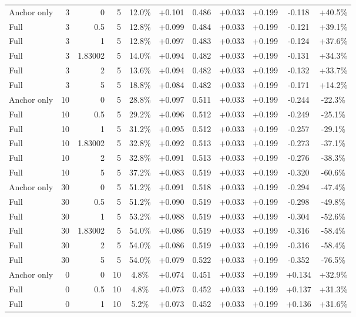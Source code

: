 \begin{table}[htbp]
\begin{tabular}{lrrrccccccc}
Anchor only & 3 & 0 & 5 & 12.0\% & +0.101 & 0.486 & +0.033 & +0.199 & -0.118 & +40.5\% \\
Full & 3 & 0.5 & 5 & 12.8\% & +0.099 & 0.484 & +0.033 & +0.199 & -0.121 & +39.1\% \\
Full & 3 & 1 & 5 & 12.8\% & +0.097 & 0.483 & +0.033 & +0.199 & -0.124 & +37.6\% \\
Full & 3 & 1.83002 & 5 & 14.0\% & +0.094 & 0.482 & +0.033 & +0.199 & -0.131 & +34.3\% \\
Full & 3 & 2 & 5 & 13.6\% & +0.094 & 0.482 & +0.033 & +0.199 & -0.132 & +33.7\% \\
Full & 3 & 5 & 5 & 18.8\% & +0.084 & 0.482 & +0.033 & +0.199 & -0.171 & +14.2\% \\
Anchor only & 10 & 0 & 5 & 28.8\% & +0.097 & 0.511 & +0.033 & +0.199 & -0.244 & -22.3\% \\
Full & 10 & 0.5 & 5 & 29.2\% & +0.096 & 0.512 & +0.033 & +0.199 & -0.249 & -25.1\% \\
Full & 10 & 1 & 5 & 31.2\% & +0.095 & 0.512 & +0.033 & +0.199 & -0.257 & -29.1\% \\
Full & 10 & 1.83002 & 5 & 32.8\% & +0.092 & 0.513 & +0.033 & +0.199 & -0.273 & -37.1\% \\
Full & 10 & 2 & 5 & 32.8\% & +0.091 & 0.513 & +0.033 & +0.199 & -0.276 & -38.3\% \\
Full & 10 & 5 & 5 & 37.2\% & +0.083 & 0.519 & +0.033 & +0.199 & -0.320 & -60.6\% \\
Anchor only & 30 & 0 & 5 & 51.2\% & +0.091 & 0.518 & +0.033 & +0.199 & -0.294 & -47.4\% \\
Full & 30 & 0.5 & 5 & 51.2\% & +0.090 & 0.519 & +0.033 & +0.199 & -0.298 & -49.8\% \\
Full & 30 & 1 & 5 & 53.2\% & +0.088 & 0.519 & +0.033 & +0.199 & -0.304 & -52.6\% \\
Full & 30 & 1.83002 & 5 & 54.0\% & +0.086 & 0.519 & +0.033 & +0.199 & -0.316 & -58.4\% \\
Full & 30 & 2 & 5 & 54.0\% & +0.086 & 0.519 & +0.033 & +0.199 & -0.316 & -58.4\% \\
Full & 30 & 5 & 5 & 54.0\% & +0.079 & 0.522 & +0.033 & +0.199 & -0.352 & -76.5\% \\
Anchor only & 0 & 0 & 10 & 4.8\% & +0.074 & 0.451 & +0.033 & +0.199 & +0.134 & +32.9\% \\
Full & 0 & 0.5 & 10 & 4.8\% & +0.073 & 0.452 & +0.033 & +0.199 & +0.137 & +31.3\% \\
Full & 0 & 1 & 10 & 5.2\% & +0.073 & 0.452 & +0.033 & +0.199 & +0.136 & +31.6\% \\

\end{tabular}
\end{table}
